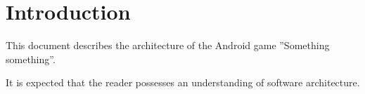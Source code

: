 \section{Introduction} %

This document describes the architecture of the Android game ''Something something''. %

It is expected that the reader possesses an understanding of software architecture.